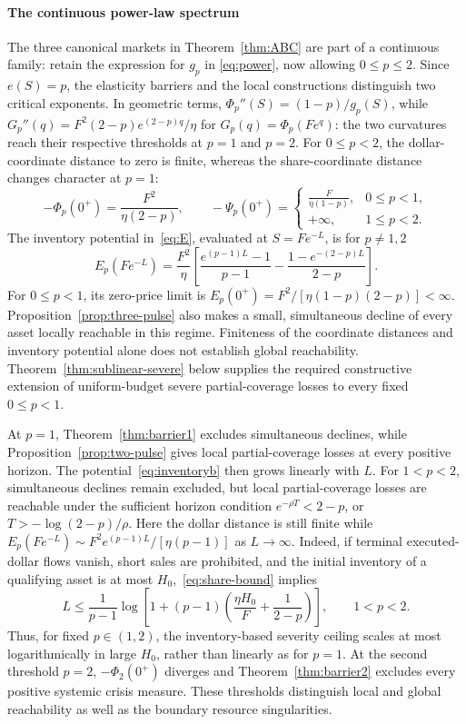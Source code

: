 \documentclass[review,hidelinks,onefignum,onetabnum]{siamonline250211}
\begin{document}
\paragraph{The continuous power-law spectrum}
The three canonical markets in Theorem~\ref{thm:ABC} are part of a
continuous family: retain the expression for $g_p$ in
\eqref{eq:power}, now allowing $0\le p\le2$. Since $e(S)=p$,
the elasticity barriers and the local constructions distinguish
two critical exponents. In geometric terms,
$\Phi_p''(S)=(1-p)/g_p(S)$, while
$G_p''(q)=F^2(2-p)e^{(2-p)q}/\eta$ for
$G_p(q)=\Phi_p(Fe^q)$: the two curvatures reach their
respective thresholds at $p=1$ and $p=2$.
For $0\le p<2$, the dollar-coordinate
distance to zero is finite, whereas the share-coordinate distance
changes character at $p=1$:
\[
-\Phi_p(0^+)=\frac{F^2}{\eta(2-p)},\qquad
-\Psi_p(0^+)=
\begin{cases}
\displaystyle\frac{F}{\eta(1-p)},&0\le p<1,\\[3pt]
+\infty,&1\le p<2.
\end{cases}
\]
The inventory potential in~\eqref{eq:E}, evaluated at
$S=Fe^{-L}$, is for $p\ne1,2$
\[
E_p(Fe^{-L})=\frac{F^2}{\eta}
\left[\frac{e^{(p-1)L}-1}{p-1}
-\frac{1-e^{-(2-p)L}}{2-p}\right].
\]
For $0\le p<1$, its zero-price limit is
$E_p(0^+)=F^2/[\eta(1-p)(2-p)]<\infty$.
Proposition~\ref{prop:three-pulse} also makes a small, simultaneous
decline of every asset locally reachable in this regime.
Finiteness of the coordinate distances and inventory potential
alone does not establish global reachability. Theorem~\ref{thm:sublinear-severe}
below supplies the required constructive extension of uniform-budget
severe partial-coverage losses to every fixed $0\le p<1$.

At $p=1$, Theorem~\ref{thm:barrier1} excludes simultaneous declines,
while Proposition~\ref{prop:two-pulse} gives local partial-coverage
losses at every positive horizon. The potential~\eqref{eq:inventoryb}
then grows linearly with $L$. For $1<p<2$, simultaneous declines
remain excluded, but local partial-coverage losses are reachable
under the sufficient horizon condition
$e^{-\rho T}<2-p$, or $T>-\log(2-p)/\rho$.
Here the dollar distance is still finite while
$E_p(Fe^{-L})\sim F^2e^{(p-1)L}/[\eta(p-1)]$ as $L\to\infty$.
Indeed, if terminal executed-dollar flows vanish, short sales
are prohibited, and the initial inventory of a qualifying asset
is at most $H_0$,~\eqref{eq:share-bound} implies
\[
L\le\frac{1}{p-1}\log\!\left[
1+(p-1)\left(\frac{\eta H_0}{F}+\frac{1}{2-p}\right)
\right],\qquad 1<p<2.
\]
Thus, for fixed $p\in(1,2)$, the inventory-based severity
ceiling scales at most logarithmically in large $H_0$, rather than
linearly as for $p=1$. At the second threshold $p=2$,
$-\Phi_2(0^+)$ diverges and Theorem~\ref{thm:barrier2}
excludes every positive systemic crisis measure. These thresholds distinguish local and global reachability as well
as the boundary resource singularities.
\end{document}
